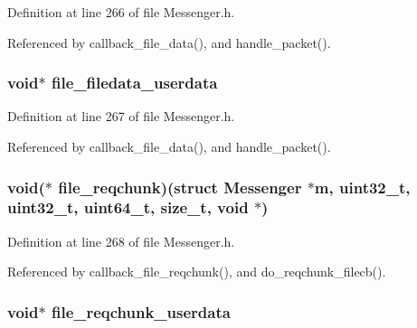 Definition at line 266 of file Messenger.\+h.



Referenced by callback\+\_\+file\+\_\+data(), and handle\+\_\+packet().

\hypertarget{struct_messenger_a69c2b7ef494a50568b37c4ade72fdb62}{
\subsubsection[{file\+\_\+filedata\+\_\+userdata}]{\setlength{\rightskip}{0pt plus 5cm}void$\ast$ file\+\_\+filedata\+\_\+userdata}}\label{struct_messenger_a69c2b7ef494a50568b37c4ade72fdb62}


Definition at line 267 of file Messenger.\+h.



Referenced by callback\+\_\+file\+\_\+data(), and handle\+\_\+packet().

\hypertarget{struct_messenger_a8e913b9866264d0e9518d54b08cc4eeb}{
\subsubsection[{file\+\_\+reqchunk}]{\setlength{\rightskip}{0pt plus 5cm}void($\ast$ file\+\_\+reqchunk)(struct {\bf Messenger} $\ast${\bf m}, uint32\+\_\+t, uint32\+\_\+t, uint64\+\_\+t, size\+\_\+t, void $\ast$)}}\label{struct_messenger_a8e913b9866264d0e9518d54b08cc4eeb}


Definition at line 268 of file Messenger.\+h.



Referenced by callback\+\_\+file\+\_\+reqchunk(), and do\+\_\+reqchunk\+\_\+filecb().

\hypertarget{struct_messenger_afab0bf4f4929791bf8cab5603f400391}{
\subsubsection[{file\+\_\+reqchunk\+\_\+userdata}]{\setlength{\rightskip}{0pt plus 5cm}void$\ast$ file\+\_\+reqchunk\+\_\+userdata}}\label{struct_messenger_afab0bf4f4929791bf8cab5603f400391}


